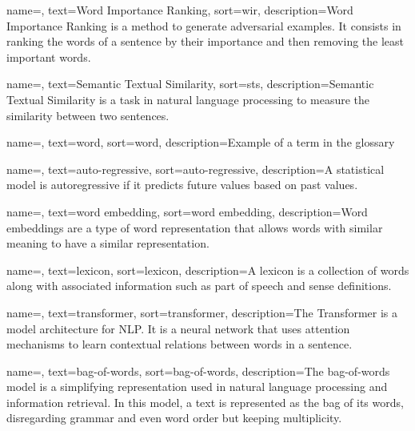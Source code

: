 {
    name=,
    text=Word Importance Ranking,
    sort=wir,
    description={Word Importance Ranking is a method to generate adversarial examples. It consists in ranking the words of a sentence by their importance and then removing the least important words.}
}

{
    name=,
    text=Semantic Textual Similarity,
    sort=sts,
    description={Semantic Textual Similarity is a task in natural language processing to measure the similarity between two sentences.}
}





{
    name=,
    text=word,
    sort=word,
    description={Example of a term in the glossary}
}

{
    name=,
    text=auto-regressive,
    sort=auto-regressive,
    description={A statistical  model is autoregressive if it predicts future values based on past values.}
}

{
    name=,
    text=word embedding,
    sort=word embedding,
    description={Word embeddings are a type of word representation that allows words with similar meaning to have a similar representation.}
}

{
    name=,
    text=lexicon,
    sort=lexicon,
    description={A lexicon is a collection of words along with associated information such as part of speech and sense definitions.}
}


{
    name=,
    text=transformer,
    sort=transformer,
    description={The Transformer is a model architecture for NLP. It is a neural network that uses attention mechanisms to learn contextual relations between words in a sentence.}
}

{
    name=,
    text=bag-of-words,
    sort=bag-of-words,
    description={The bag-of-words model is a simplifying representation used in natural language processing and information retrieval. In this model, a text is represented as the bag of its words, disregarding grammar and even word order but keeping multiplicity.}
}

